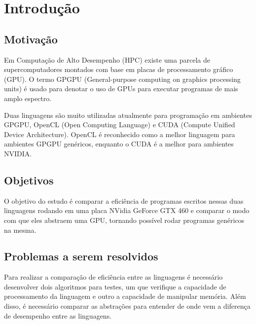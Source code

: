 \section{Introdução}
\subsection{Motivação}
Em Computação de Alto Desempenho (HPC) existe uma parcela de supercomputadores montados com base em placas
de processamento gráfico (GPU). O termo GPGPU (General-purpose computing on graphics processing units) é
usado para denotar o uso de GPUs para executar programas de mais amplo espectro.

Duas linguagens são muito utilizadas atualmente para programação em ambientes GPGPU, OpenCL (Open Computing Language) 
e CUDA (Compute Unified Device Architecture). OpenCL é reconhecido como a melhor linguagem para ambientes GPGPU
genéricos, enquanto o CUDA é a melhor para ambientes NVIDIA.

\subsection{Objetivos}
O objetivo do estudo é comparar a eficiência de programas escritos nessas duas linguagens rodando em uma placa NVidia GeForce GTX 460
e comparar o modo com que eles abstraem uma GPU, tornando possível rodar programas genéricos na mesma.

\subsection{Problemas a serem resolvidos}
Para realizar a comparação de eficiência entre as linguagens é necessário desenvolver dois algoritmos para testes, um que verifique
a capacidade de processamento da linguagem e outro a capacidade de manipular memória. Além disso, é necessário comparar as abstrações
para entender de onde vem a diferença de desempenho entre as linguagens.
